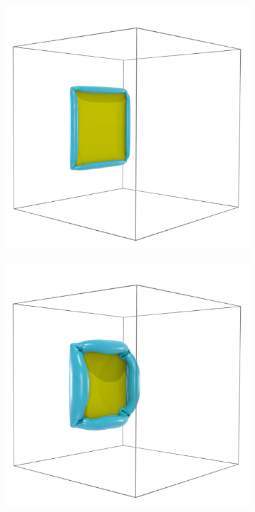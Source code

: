 \documentclass[preprint,12pt]{elsarticle}
\begin{document}
\begin{figure}
    \centering
    \begin{subfigure}{.33\textwidth}
        \centering
        \includegraphics[width=\textwidth]{tex/fig/disk_high_re_2.png}
    \end{subfigure}%
    \begin{subfigure}{.33\textwidth}
        \centering
        \includegraphics[width=\textwidth]{tex/fig/disk_high_re_3.png}

\end{subfigure}
\end{figure}
\end{document}
